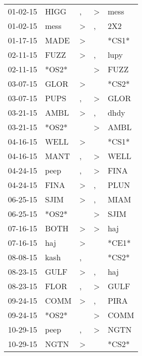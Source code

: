 \begin{supertabular}{lllll}
 01-02-15 &   HIGG &                , &     \textgreater &   mess \\
 01-02-15 &   mess &     \textgreater &                , &    2X2 \\
 01-17-15 &   MADE &     \textgreater &                  &  *CS1* \\
 02-11-15 &   FUZZ &     \textgreater &                , &   lupy \\
 02-11-15 &  *OS2* &                  &     \textgreater &   FUZZ \\
 03-07-15 &   GLOR &     \textgreater &                  &  *CS2* \\
 03-07-15 &   PUPS &                , &     \textgreater &   GLOR \\
 03-21-15 &   AMBL &     \textgreater &                , &   dhdy \\
 03-21-15 &  *OS2* &                  &     \textgreater &   AMBL \\
 04-16-15 &   WELL &     \textgreater &                  &  *CS1* \\
 04-16-15 &   MANT &                , &     \textgreater &   WELL \\
 04-24-15 &   peep &                , &     \textgreater &   FINA \\
 04-24-15 &   FINA &     \textgreater &                , &   PLUN \\
 06-25-15 &   SJIM &     \textgreater &                , &   MIAM \\
 06-25-15 &  *OS2* &                  &     \textgreater &   SJIM \\
 07-16-15 &   BOTH &     \textgreater &     \textgreater &    haj \\
 07-16-15 &    haj &     \textgreater &                  &  *CE1* \\
 08-08-15 &   kash &                , &                  &  *CS2* \\
 08-23-15 &   GULF &     \textgreater &                , &    haj \\
 08-23-15 &   FLOR &                , &     \textgreater &   GULF \\
 09-24-15 &   COMM &     \textgreater &                , &   PIRA \\
 09-24-15 &  *OS2* &                  &     \textgreater &   COMM \\
 10-29-15 &   peep &                , &     \textgreater &   NGTN \\
 10-29-15 &   NGTN &     \textgreater &                  &  *CS2* \\

\end{supertabular}
